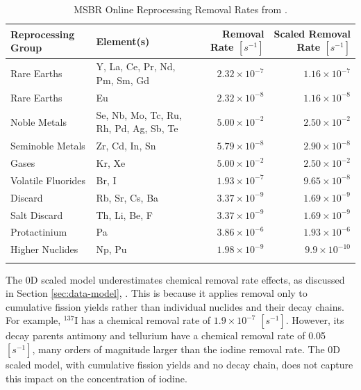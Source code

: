 \begin{table}[H]
\renewcommand{\arraystretch}{1.25}
\caption{MSBR Online Reprocessing Removal Rates from \cite{robertson_conceptual_1971}.}
\begin{center}
\begin{tabular}{ l p{} r r}
 \hline
 Reprocessing Group & Element(s) & Removal Rate $[s^{-1}]$ & Scaled Removal Rate $[s^{-1}]$\\
 \hline
 Rare Earths & Y, La, Ce, Pr, Nd, Pm, Sm, Gd & $2.32 \times 10^{-7}$ & $1.16 \times 10^{-7}$\\
 Rare Earths & Eu & $2.32 \times 10^{-8}$ & $1.16 \times 10^{-8}$\\
 Noble Metals  & Se, Nb, Mo, Tc, Ru, Rh, Pd, Ag, Sb, Te & $5.00 \times 10^{-2}$ & $2.50 \times 10^{-2}$\\
 Seminoble Metals & Zr, Cd, In, Sn &  $5.79 \times 10^{-8}$ &  $2.90 \times 10^{-8}$\\
 Gases & Kr, Xe & $5.00 \times 10^{-2}$ & $2.50 \times 10^{-2}$\\
 Volatile Fluorides & Br, I & $1.93 \times 10^{-7}$ & $9.65 \times 10^{-8}$\\
 Discard & Rb, Sr, Cs, Ba & $3.37 \times 10^{-9}$ & $1.69 \times 10^{-9}$\\
 Salt Discard & Th, Li, Be, F & $3.37 \times 10^{-9}$ & $1.69 \times 10^{-9}$\\
 Protactinium & Pa & $3.86 \times 10^{-6}$ & $1.93 \times 10^{-6}$\\
 Higher Nuclides & Np, Pu & $1.98 \times 10^{-9}$ & $9.9 \times 10^{-10}$\\
 \hline
 \label{tab:msbr_cycle_times_scaled}
\end{tabular}
\end{center}
\end{table}

The 0D scaled model underestimates chemical removal rate effects, as discussed in Section \ref{sec:data-model}, .
This is because it applies removal only to cumulative fission yields rather than individual nuclides and their decay chains.
For example, $^{137}$I has a chemical removal rate of $1.9\times 10^{-7}$ $[s^{-1}]$.
However, its decay parents antimony and tellurium have a chemical removal rate of 0.05 $[s^{-1}]$, many orders of magnitude larger than the iodine removal rate.
The 0D scaled model, with cumulative fission yields and no decay chain, does not capture this impact on the concentration of iodine.

\FloatBarrier
